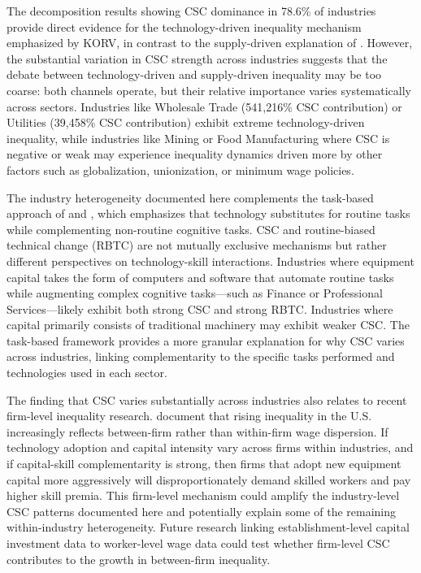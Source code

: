 \documentclass[12pt]{article}
\begin{document}
The decomposition results showing CSC dominance in 78.6\% of industries provide direct evidence for the technology-driven inequality mechanism emphasized by KORV, in contrast to the supply-driven explanation of \citet{card2001can}. However, the substantial variation in CSC strength across industries suggests that the debate between technology-driven and supply-driven inequality may be too coarse: both channels operate, but their relative importance varies systematically across sectors. Industries like Wholesale Trade (541,216\% CSC contribution) or Utilities (39,458\% CSC contribution) exhibit extreme technology-driven inequality, while industries like Mining or Food Manufacturing where CSC is negative or weak may experience inequality dynamics driven more by other factors such as globalization, unionization, or minimum wage policies.

The industry heterogeneity documented here complements the task-based approach of \citet{autor2003skill} and \citet{acemoglu2011skills}, which emphasizes that technology substitutes for routine tasks while complementing non-routine cognitive tasks. CSC and routine-biased technical change (RBTC) are not mutually exclusive mechanisms but rather different perspectives on technology-skill interactions. Industries where equipment capital takes the form of computers and software that automate routine tasks while augmenting complex cognitive tasks---such as Finance or Professional Services---likely exhibit both strong CSC and strong RBTC. Industries where capital primarily consists of traditional machinery may exhibit weaker CSC. The task-based framework provides a more granular explanation for why CSC varies across industries, linking complementarity to the specific tasks performed and technologies used in each sector.

The finding that CSC varies substantially across industries also relates to recent firm-level inequality research. \citet{song2019firming} document that rising inequality in the U.S. increasingly reflects between-firm rather than within-firm wage dispersion. If technology adoption and capital intensity vary across firms within industries, and if capital-skill complementarity is strong, then firms that adopt new equipment capital more aggressively will disproportionately demand skilled workers and pay higher skill premia. This firm-level mechanism could amplify the industry-level CSC patterns documented here and potentially explain some of the remaining within-industry heterogeneity. Future research linking establishment-level capital investment data to worker-level wage data could test whether firm-level CSC contributes to the growth in between-firm inequality.
\end{document}
